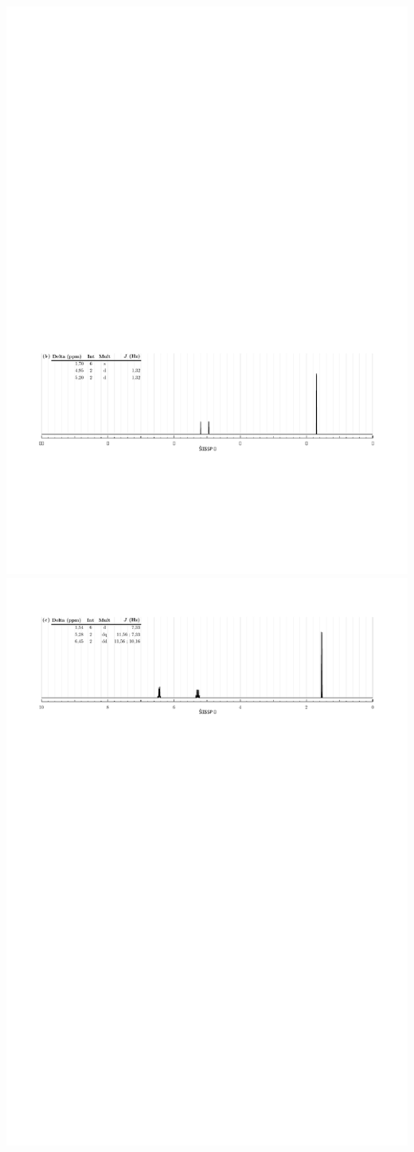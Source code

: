 \begin{center}
    \includegraphics[width=.95\linewidth]{chimiePC/orga/RMN_23.pdf}
    \includegraphics[width=.95\linewidth]{chimiePC/orga/RMN_ZZ.pdf}

\end{center}
